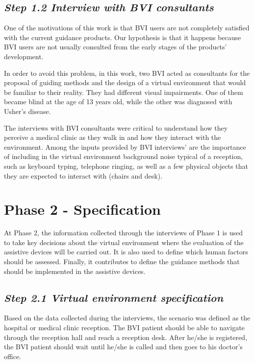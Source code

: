     \subsection*{\textit{Step 1.2 Interview with BVI consultants}}
    
        One of the motivations of this work is that BVI users are not completely satisfied with the current guidance products. Our hypothesis is that it happens because BVI users are not usually consulted from the early stages of the products’ development.

        In order to avoid this problem, in this work, two BVI acted as consultants for the proposal of guiding methods and the design of a virtual environment that would be familiar to their reality. They had different visual impairments. One of them became blind at the age of 13 years old, while the other was diagnosed with Usher’s disease. 

        The interviews with BVI consultants were critical to understand how they perceive a medical clinic as they walk in and how they interact with the environment. Among the inputs provided by BVI interviews’ are the importance of including in the virtual environment background noise typical of a reception, such as keyboard typing, telephone ringing, as well as a few physical objects that they are expected to interact with (chairs and desk).
    

\section{Phase 2 - Specification}
\label{sec:idealization_phase}
    At Phase 2, the information collected through the interviews of Phase 1 is used to take key decisions about the virtual environment where the evaluation of the assistive devices will be carried out. It is also used to define which human factors should be assessed. Finally, it contributes to define the guidance methods that should be implemented in the assistive devices.
    

    \subsection*{\textit{Step 2.1 Virtual environment specification}}
        Based on the data collected during the interviews, the scenario was defined as the hospital or medical clinic reception. The BVI patient should be able to navigate through the reception hall and reach a reception desk. After he/she is registered, the BVI patient should wait until he/she is called and then goes to his doctor’s office.

